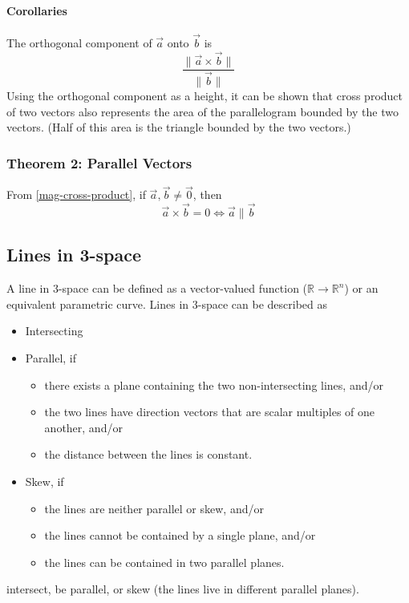 \documentclass{article}
\newcommand{\vect}[1]{\ensuremath{\overrightarrow{#1}}}
\newcommand{\magnitude}[1]{\ensuremath{\lVert #1 \rVert}}
\newcommand{\magvect}[1]{\magnitude{\vect{#1}}}
\begin{document}
\paragraph{Corollaries}
The orthogonal component of $\vect{a}$ onto $\vect{b}$ is $$\frac{\magnitude{\vect{a}\times\vect{b}}}{\magvect{b}}$$
Using the orthogonal component as a height, it can be shown that cross product of two vectors also represents the area of the parallelogram bounded by the two vectors. (Half of this area is the triangle bounded by the two vectors.)

\subsubsection{Theorem 2: Parallel Vectors}
From \ref{mag-cross-product}, if $\vect{a}, \vect{b} \ne \vect{0}$, then $$\vect{a} \times \vect{b} = 0 \iff \vect{a} \parallel \vect{b}$$

\subsection{Lines in 3-space}
A line in 3-space can be defined as a vector-valued function ($\mathbb{R} \to \mathbb{R}^n$) or an equivalent parametric curve.
Lines in 3-space can be described as
\begin{itemize}
    \item Intersecting
    \item Parallel, if
    \begin{itemize}
        \item there exists a plane containing the two non-intersecting lines, and/or
        \item the two lines have direction vectors that are scalar multiples of one another, and/or
        \item the distance between the lines is constant.
    \end{itemize}
    \item Skew, if
    \begin{itemize}
        \item the lines are neither parallel or skew, and/or
        \item the lines cannot be contained by a single plane, and/or
        \item the lines can be contained in two parallel planes.
    \end{itemize}
\end{itemize}
intersect, be parallel, or skew (the lines live in different parallel planes).
\end{document}
